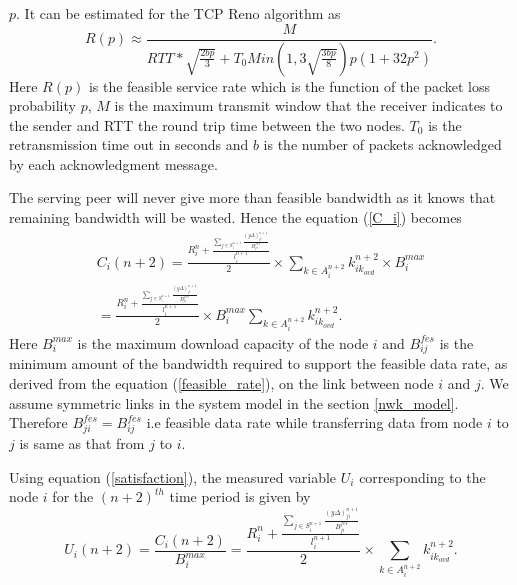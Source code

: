\documentclass[journal]{IEEEtran}
\begin{document}
$p$. It can be estimated for the TCP Reno algorithm \cite{feasible_rate} as
\begin{equation}
	\nonumber
	\label{feasible_rate}
	R(p){\approx}\frac{M}{RTT*\sqrt{\frac{2bp}{3}}+T_{0}Min(1,3\sqrt{\frac{3bp}{8}})p(1+32p^2)}.
\end{equation}
Here $R(p)$ is the feasible service rate which is the function of the packet loss probability $p$, $M$ is the maximum transmit window that the receiver indicates to the sender and RTT the round trip time between the two nodes. $T_0$ is the retransmission time out in seconds and $b$ is the number of packets acknowledged by each acknowledgment message.  

The serving peer will never give more than feasible bandwidth as it knows  that remaining bandwidth will be wasted.  Hence the equation (\ref{C_i}) becomes 
\begin{gather}
	\nonumber
	C_i(n+2)=\frac{R_i^n+{\frac{\sum\limits_{j\in{S^{n+1}_i}}\frac{(y\Delta)_{ji}^{n+1}}{B_{ji}^{fes}}}{l_i^{n+1}}}}{2}\times{\sum\limits_{k\in{A^{n+2}_i}}k_{{ik}_{ovd}}^{n+2}{\times}B_{i}^{max}}\\
	=\frac{R_i^n+{\frac{\sum\limits_{j\in{S^{n+1}_i}}\frac{(y\Delta)_{ji}^{n+1}}{B_{ji}^{fes}}}{l_i^{n+1}}}}{2}\times{B_i^{max}}{\sum\limits_{k\in{A^{n+2}_i}}k_{{ik}_{ovd}}^{n+2}}.
\end{gather}
Here $B_i^{max}$ is the maximum download capacity of the node $i$ and $B_{ij}^{fes}$ is the minimum amount of the bandwidth required to support the feasible data rate, as derived from the equation (\ref{feasible_rate}), on the link between node $i$ and $j$. We assume symmetric links in the system model in the  section \ref{nwk_model}. Therefore $B_{ji}^{fes}=B_{ij}^{fes}$ i.e feasible data rate while transferring data from node $i$ to $j$ is same as that from $j$ to $i$.

Using equation (\ref{satisfaction}), the measured variable $U_i$ corresponding to the node $i$ for the $(n+2)^{th}$ time period is given by
\begin{equation}
	\label{utility_1}
	U_i(n+2)=\frac{C_i(n+2)}{B_i^{max}}=\frac{{R_{i}^{n}}+{\frac{\sum\limits_{j\in{S^{n+1}_i}}\frac{(y\Delta)_{ji}^{n+1}}{B_{ji}^{fes}}}{l_i^{n+1}}}}{2}\times{\sum\limits_{k\in{A^{n+2}_i}}k_{{ik}_{ovd}}^{n+2}}.
\end{equation}
\end{document}
